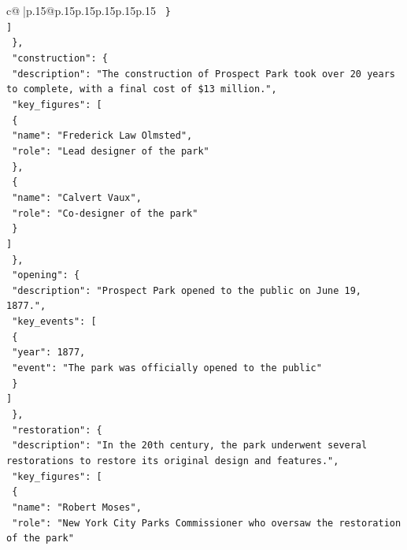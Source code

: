 \documentclass{article}
\begin{document}
{\begin{supertabular}{c@{$\;$}|p{.15\linewidth}@{}p{.15\linewidth}p{.15\linewidth}p{.15\linewidth}p{.15\linewidth}p{.15\linewidth}}
{{{\texttt{        \}} \\
\texttt{      {]}} \\
\texttt{    \},} \\
\texttt{    "construction": \{} \\
\texttt{      "description": "The construction of Prospect Park took over 20 years to complete, with a final cost of \$13 million.",} \\
\texttt{      "key\_figures": {[}} \\
\texttt{        \{} \\
\texttt{          "name": "Frederick Law Olmsted",} \\
\texttt{          "role": "Lead designer of the park"} \\
\texttt{        \},} \\
\texttt{        \{} \\
\texttt{          "name": "Calvert Vaux",} \\
\texttt{          "role": "Co{-}designer of the park"} \\
\texttt{        \}} \\
\texttt{      {]}} \\
\texttt{    \},} \\
\texttt{    "opening": \{} \\
\texttt{      "description": "Prospect Park opened to the public on June 19, 1877.",} \\
\texttt{      "key\_events": {[}} \\
\texttt{        \{} \\
\texttt{          "year": 1877,} \\
\texttt{          "event": "The park was officially opened to the public"} \\
\texttt{        \}} \\
\texttt{      {]}} \\
\texttt{    \},} \\
\texttt{    "restoration": \{} \\
\texttt{      "description": "In the 20th century, the park underwent several restorations to restore its original design and features.",} \\
\texttt{      "key\_figures": {[}} \\
\texttt{        \{} \\
\texttt{          "name": "Robert Moses",} \\
\texttt{          "role": "New York City Parks Commissioner who oversaw the restoration of the park"} \\
}}}
\end{supertabular}}
\end{document}
